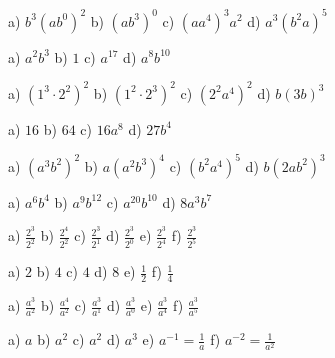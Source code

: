     \begin{tehtava}
        a) $b^3(ab^0)^2$ \qquad
        b) $(ab^3)^0$ \qquad
        c) $(aa^4)^3a^2$ \qquad
        d) $a^3(b^2a)^5$

        \begin{vastaus}
            a) $a^2b^3$ \qquad
            b) $1$ \qquad
            c) $a^{17}$ \qquad
            d) $a^8b^{10}$
        \end{vastaus}
    \end{tehtava}

    \begin{tehtava}
        a) $(1^3\cdot 2^2)^2$ \qquad
        b) $(1^2\cdot 2^3)^2$ \qquad
        c) $(2^2a^4)^2$ \qquad
        d) $b(3b)^3$

        \begin{vastaus}
            a) $16$ \qquad
            b) $64$ \qquad
            c) $16a^8$ \qquad
            d) $27b^4$
        \end{vastaus}
    \end{tehtava}
    
    \begin{tehtava}
        a) $(a^3b^2)^2$ \qquad
        b) $a(a^2b^3)^4$ \qquad
        c) $(b^2a^4)^5$ \qquad
        d) $b(2ab^2)^3$
        
        \begin{vastaus}
            a) $a^6b^4$ \qquad
            b) $a^9b^{12}$ \qquad
            c) $a^{20}b^{10}$ \qquad
            d) $8a^3b^7$
        \end{vastaus}
    \end{tehtava}
    
    \begin{tehtava}
        a) $\frac{2^3}{2^2}$ \qquad
        b) $\frac{2^4}{2^2}$ \qquad
        c) $\frac{2^3}{2^1}$ \qquad
        d) $\frac{2^3}{2^0}$ \qquad
        e) $\frac{2^3}{2^4}$ \qquad
        f) $\frac{2^3}{2^5}$
        
        \begin{vastaus}
            a) $2$ \qquad
            b) $4$ \qquad
            c) $4$ \qquad
            d) $8$ \qquad
            e) $\frac{1}{2}$ \qquad
            f) $\frac{1}{4}$
        \end{vastaus}
    \end{tehtava}
    
    \begin{tehtava}
        a) $\frac{a^3}{a^2}$ \qquad
        b) $\frac{a^4}{a^2}$ \qquad
        c) $\frac{a^3}{a^1}$ \qquad
        d) $\frac{a^3}{a^0}$ \qquad
        e) $\frac{a^3}{a^4}$ \qquad
        f) $\frac{a^3}{a^5}$
        
        \begin{vastaus}
            a) $a$ \qquad
            b) $a^2$ \qquad
            c) $a^2$ \qquad
            d) $a^3$ \qquad
            e) $a^{-1} = \frac{1}{a}$ \qquad
            f) $a^{-2} = \frac{1}{a^2}$
        \end{vastaus}
    \end{tehtava}
    
